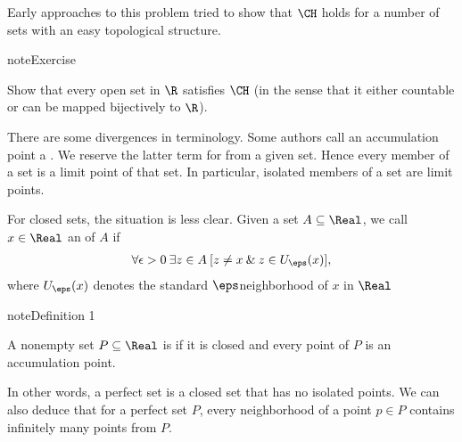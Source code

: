\documentclass[letterpaper,10pt,english]{jupyterBook}
\begin{document}
\sphinxAtStartPar
Early approaches to this problem tried to show that \(\CH\) holds for a number of sets with an easy topological structure.

\begin{sphinxadmonition}{note}{Exercise}

\sphinxAtStartPar
Show that every open set in \(\R\) satisfies \(\CH\) (in the sense that it either countable or can be mapped bijectively to \(\R\)).
\end{sphinxadmonition}

\begin{sphinxShadowBox}
\sphinxstylesidebartitle{}

\sphinxAtStartPar
There are some divergences in terminology. Some authors call an accumulation point a . We reserve the latter term for 
from a given set. Hence every member of a set is a limit point of that set. In particular, isolated members of a set are limit points.
\end{sphinxShadowBox}

\sphinxAtStartPar
For closed sets, the situation is less clear. Given a set \(A \subseteq \Real\), we call \(x \in \Real\) an  of \(A\) if
\begin{equation*}
\begin{split}
\forall \epsilon > 0 \: \exists z \in A \: [z \neq x \: \& \: z \in U_\eps(x)],
\end{split}
\end{equation*}
\sphinxAtStartPar
where \(U_\eps(x)\) denotes the standard \(\eps\)\sphinxhyphen{}neighborhood of \(x\) in \(\Real\)
\label{perfect_subsets_R:def-perfect}
\begin{sphinxadmonition}{note}{Definition 1}



\sphinxAtStartPar
A non\sphinxhyphen{}empty set \(P \subseteq \Real\) is  if it is closed and every point of \(P\) is an accumulation point.
\end{sphinxadmonition}

\sphinxAtStartPar
In other words, a perfect set is a closed set that has no isolated points. We can also deduce that for a perfect set \(P\), every neighborhood of a point \(p \in P\) contains infinitely many points from \(P\).

\begin{sphinxShadowBox}
\sphinxstylesidebartitle{}

\begin{center}
\noindent{}
\label{\detokenize{perfect_subsets_R:id2}}\end{center}
\end{sphinxShadowBox}
\end{document}
